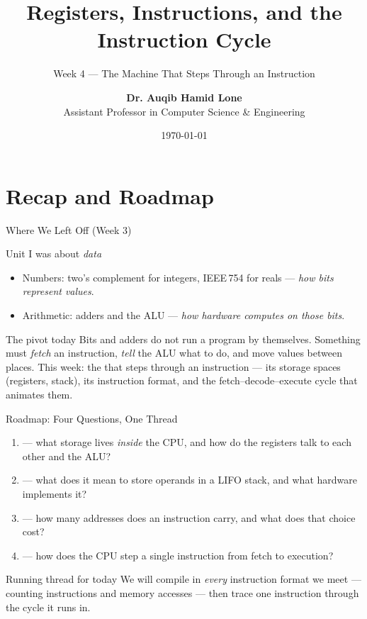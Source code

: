 \documentclass[aspectratio=169]{beamer}
\title{Registers, Instructions, and the Instruction Cycle}
\subtitle{Week 4 --- The Machine That Steps Through an Instruction}
\author[Dr. Auqib Hamid Lone]{%
  \textbf{Dr. Auqib Hamid Lone}\\
  \small Assistant Professor in Computer Science \& Engineering
}
\institute[GCET Ganderbal]{%
  \small\textbf{PCC CS-401: Computer Organization and Architecture}\\[0.3em]
  Department of Computer Science \& Engineering\\
  Government College of Engineering \& Technology (GCET), Ganderbal
}
\date[\today]{\small\today}
\begin{document}
\frame{\titlepage}

\section{Recap and Roadmap}

\begin{frame}{Where We Left Off (Week 3)}
  \begin{block}{Unit I was about \emph{data}}
    \begin{itemize}
      \item Numbers: two's complement for integers, IEEE\,754 for reals ---
        \emph{how bits represent values}.
      \item Arithmetic: adders and the ALU --- \emph{how hardware computes on
        those bits}.
    \end{itemize}
  \end{block}
  \vspace{0.2cm}
  \begin{exampleblock}{The pivot today}
    Bits and adders do not run a program by themselves. Something must
    \emph{fetch} an instruction, \emph{tell} the ALU what to do, and move values
    between places. This week: the  that steps through an
    instruction --- its storage spaces (registers, stack), its instruction
    format, and the fetch--decode--execute cycle that animates them.
  \end{exampleblock}
\end{frame}

\begin{frame}{Roadmap: Four Questions, One Thread}
  \begin{enumerate}
    \item {} --- what storage lives \emph{inside} the
      CPU, and how do the registers talk to each other and the ALU?
    \item {} --- what does it mean to store operands in a
      LIFO stack, and what hardware implements it?
    \item {} --- how many addresses does an instruction
      carry, and what does that choice cost?
    \item {} --- how does the CPU step a
      single instruction from fetch to execution?
  \end{enumerate}
  \vspace{0.3cm}
  \begin{alertblock}{Running thread for today}
    We will compile  in \emph{every}
    instruction format we meet --- counting instructions and memory accesses ---
    then trace one instruction through the cycle it runs in.
  \end{alertblock}
\end{frame}
\end{document}
